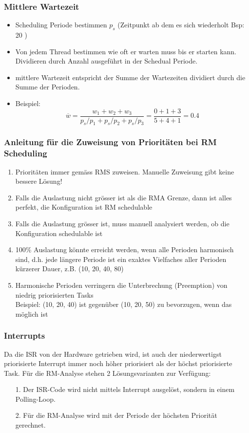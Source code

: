 \subsubsection{Mittlere Wartezeit}
\begin{itemize}[noitemsep,topsep=0pt]
  \item Scheduling Periode bestimmen $p_s$ (Zeitpunkt ab dem es sich wiederholt Bsp: 20 )
  \item Von jedem Thread bestimmen wie oft er warten muss bis er starten kann.\\Dividieren durch Anzahl ausgeführt in der Schedual Periode.
  \item mittlere Wartezeit entspricht der Summe der Wartezeiten dividiert durch die Summe der Perioden.
  \item Beispiel:
        \begin{equation}
          \overline{w} = \frac{w_1+w_2+w_3}{p_s/p_1 + p_s/p_2 + p_s/p_3} = \frac{0+1+3}{5+4+1} = 0.4
        \end{equation}
\end{itemize}

\subsubsection{Anleitung für die Zuweisung von Prioritäten bei RM Scheduling}
\begin{enumerate}
  \item Prioritäten immer gemäss RMS zuweisen. Manuelle Zuweisung gibt keine bessere Lösung!
  \item Falls die Auslastung nicht grösser ist als die RMA Grenze, dann ist alles perfekt, die Konfiguration ist RM schedulable
  \item Falls die Auslastung grösser ist, muss manuell analysiert werden, ob die Konfiguration schedulable ist
  \item 100\% Auslastung könnte erreicht werden, wenn alle Perioden harmonisch sind, d.h. jede längere Periode ist ein exaktes Vielfaches aller Perioden kürzerer Dauer, z.B. (10, 20, 40, 80)
  \item Harmonische Perioden verringern die Unterbrechung (Preemption) von niedrig priorisierten Tasks\\
        Beispiel: (10, 20, 40) ist gegenüber (10, 20, 50) zu bevorzugen, wenn das möglich ist
\end{enumerate}


\subsubsection{Interrupts}
Da die ISR von der Hardware getrieben wird, ist auch der niederwertigst priorisierte Interrupt
immer noch höher priorisiert als der höchst priorisierte Task. Für die RM-Analyse stehen 2 Lösungsvarianten zur Verfügung:
\begin{itemize}
  \item[1.]  Der ISR-Code wird nicht mittels Interrupt ausgelöst, sondern in einem Polling-Loop.
  \item[2.]  Für die RM-Analyse wird mit der Periode der höchsten Priorität gerechnet.
\end{itemize}
